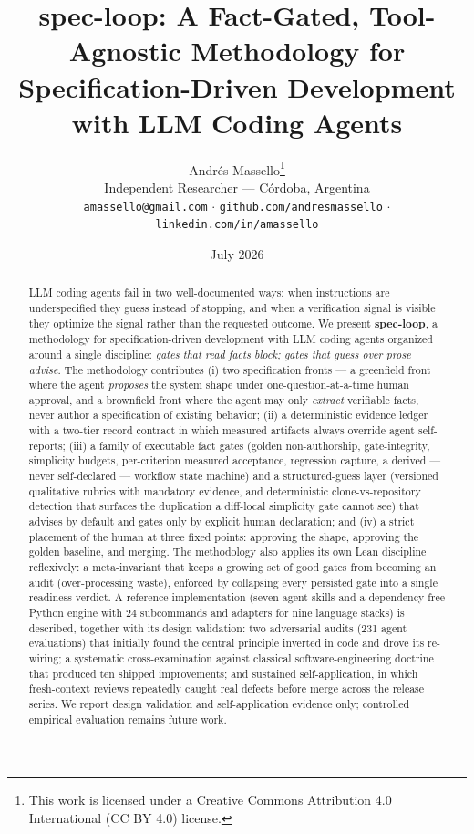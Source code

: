\documentclass[11pt]{article}
\title{\textbf{spec-loop: A Fact-Gated, Tool-Agnostic Methodology for\\Specification-Driven Development with LLM Coding Agents}}
\author{Andr\'es Massello\thanks{This work is licensed under a Creative
Commons Attribution 4.0 International (CC BY 4.0) license.}\\
\small Independent Researcher --- C\'ordoba, Argentina\\
\small \texttt{amassello@gmail.com} $\cdot$ \texttt{github.com/andresmassello}
$\cdot$ \texttt{linkedin.com/in/amassello}}
\date{July 2026}
\begin{document}
\maketitle

\begin{abstract}
LLM coding agents fail in two well-documented ways: when instructions are
underspecified they guess instead of stopping, and when a verification signal is
visible they optimize the signal rather than the requested outcome. We present
\textbf{spec-loop}, a methodology for specification-driven development with LLM
coding agents organized around a single discipline: \emph{gates that read facts
block; gates that guess over prose advise}. The methodology contributes (i) two
specification fronts --- a greenfield front where the agent \emph{proposes} the
system shape under one-question-at-a-time human approval, and a brownfield front
where the agent may only \emph{extract} verifiable facts, never author a
specification of existing behavior; (ii) a deterministic evidence ledger with a
two-tier record contract in which measured artifacts always override agent
self-reports; (iii) a family of executable fact gates (golden non-authorship,
gate-integrity, simplicity budgets, per-criterion measured acceptance,
regression capture, a derived --- never self-declared --- workflow state machine)
and a structured-guess layer (versioned qualitative rubrics with mandatory
evidence, and deterministic clone-vs-repository detection that surfaces the
duplication a diff-local simplicity gate cannot see) that advises by default and
gates only by explicit human declaration; and (iv) a strict placement of the
human at three fixed points: approving the shape, approving the golden baseline,
and merging. The methodology also applies its own Lean discipline reflexively:
a meta-invariant that keeps a growing set of good gates from becoming an audit
(over-processing waste), enforced by collapsing every persisted gate into a
single readiness verdict. A reference implementation (seven agent skills and a
dependency-free Python engine with 24 subcommands and adapters for nine language
stacks) is described, together with its design
validation: two adversarial audits (231 agent evaluations) that initially found
the central principle inverted in code and drove its re-wiring; a systematic
cross-examination against classical software-engineering doctrine that produced
ten shipped improvements; and sustained self-application, in which fresh-context
reviews repeatedly caught real defects before merge across the release series. We report design
validation and self-application evidence only; controlled empirical evaluation
remains future work.
\end{abstract}
\end{document}
